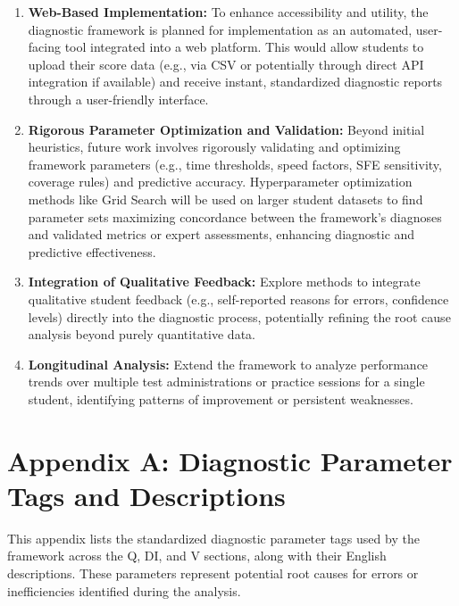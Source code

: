 \documentclass{article}
\begin{document}
\begin{enumerate}
    \item \textbf{Web-Based Implementation:} To enhance accessibility and utility, the diagnostic framework is planned for implementation as an automated, user-facing tool integrated into a web platform. This would allow students to upload their score data (e.g., via CSV or potentially through direct API integration if available) and receive instant, standardized diagnostic reports through a user-friendly interface.
   \item \textbf{Rigorous Parameter Optimization and Validation:} Beyond initial heuristics, future work involves rigorously validating and optimizing framework parameters (e.g., time thresholds, speed factors, SFE sensitivity, coverage rules) and predictive accuracy. Hyperparameter optimization methods like Grid Search will be used on larger student datasets to find parameter sets maximizing concordance between the framework's diagnoses and validated metrics or expert assessments, enhancing diagnostic and predictive effectiveness.
    \item \textbf{Integration of Qualitative Feedback:} Explore methods to integrate qualitative student feedback (e.g., self-reported reasons for errors, confidence levels) directly into the diagnostic process, potentially refining the root cause analysis beyond purely quantitative data.
    \item \textbf{Longitudinal Analysis:} Extend the framework to analyze performance trends over multiple test administrations or practice sessions for a single student, identifying patterns of improvement or persistent weaknesses.
\end{enumerate}

\newpage %
    \appendix
    \section*{Appendix A: Diagnostic Parameter Tags and Descriptions}
    
    This appendix lists the standardized diagnostic parameter tags used by the framework across the Q, DI, and V sections, along with their English descriptions. These parameters represent potential root causes for errors or inefficiencies identified during the analysis.
    
\end{document}
